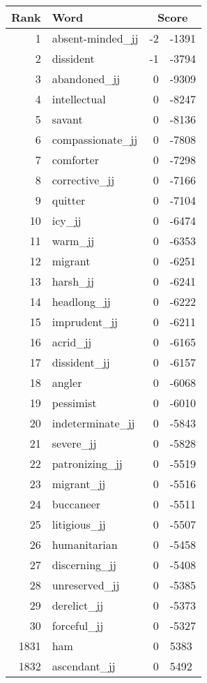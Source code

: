 \begin{longtable}[!htbp]{| rlr@{.}l |}
    \hline
    \textbf{Rank} & \textbf{Word} & \multicolumn{2}{c|}{\textbf{Score}} \\
    \hline
    \endhead
    1 & absent-minded\_jj & -2 & -1391 \\
    2 & dissident & -1 & -3794 \\
    3 & abandoned\_jj & 0 & -9309 \\
    4 & intellectual & 0 & -8247 \\
    5 & savant & 0 & -8136 \\
    6 & compassionate\_jj & 0 & -7808 \\
    7 & comforter & 0 & -7298 \\
    8 & corrective\_jj & 0 & -7166 \\
    9 & quitter & 0 & -7104 \\
    10 & icy\_jj & 0 & -6474 \\
    11 & warm\_jj & 0 & -6353 \\
    12 & migrant & 0 & -6251 \\
    13 & harsh\_jj & 0 & -6241 \\
    14 & headlong\_jj & 0 & -6222 \\
    15 & imprudent\_jj & 0 & -6211 \\
    16 & acrid\_jj & 0 & -6165 \\
    17 & dissident\_jj & 0 & -6157 \\
    18 & angler & 0 & -6068 \\
    19 & pessimist & 0 & -6010 \\
    20 & indeterminate\_jj & 0 & -5843 \\
    21 & severe\_jj & 0 & -5828 \\
    22 & patronizing\_jj & 0 & -5519 \\
    23 & migrant\_jj & 0 & -5516 \\
    24 & buccaneer & 0 & -5511 \\
    25 & litigious\_jj & 0 & -5507 \\
    26 & humanitarian & 0 & -5458 \\
    27 & discerning\_jj & 0 & -5408 \\
    28 & unreserved\_jj & 0 & -5385 \\
    29 & derelict\_jj & 0 & -5373 \\
    30 & forceful\_jj & 0 & -5327 \\
    1831 & ham & 0 & 5383 \\
    1832 & ascendant\_jj & 0 & 5492 \\

\end{longtable}
